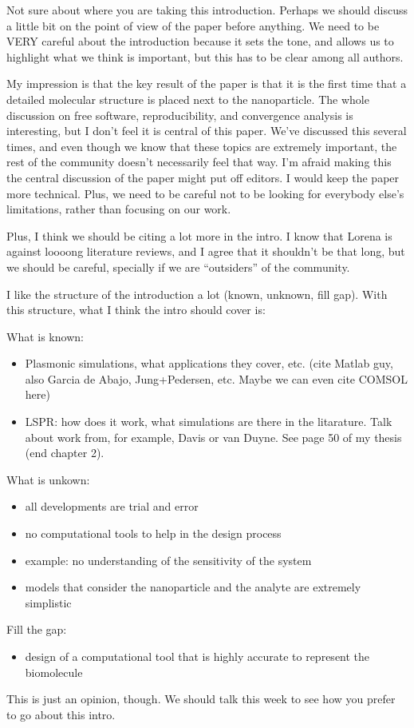 {\color{red} Not sure about where you are taking this introduction.
Perhaps we should discuss a little bit on the point of view of the paper before anything.
We need to be VERY careful about the introduction because it sets the tone, and allows us to highlight what we think is important, but this has to be clear among all authors. 

My impression is that the key result of the paper is that it is the first time that a detailed molecular structure is placed next to the nanoparticle.
The whole discussion on free software, reproducibility, and convergence analysis is interesting, but I don't feel it is central of this paper. 
We've discussed this several times, and even though we know that these topics are extremely important, the rest of the community doesn't necessarily feel that way.
I'm afraid making this the central discussion of the paper might put off editors. 
I would keep the paper more technical.
Plus, we need to be careful not to be looking for everybody else's limitations, rather than focusing on our work.

Plus, I think we should be citing a lot more in the intro. 
I know that Lorena is against loooong literature reviews, and I agree that it shouldn't be that long, but we should be careful, specially if we are ``outsiders'' of the community.

I like the structure of the introduction a lot (known, unknown, fill gap). 
With this structure, what I think the intro should cover is:

What is known:
\begin{itemize}
\item Plasmonic simulations, what applications they cover, etc. (cite Matlab guy, also Garcia de Abajo, Jung+Pedersen, etc. Maybe we can even cite COMSOL here)
\item LSPR: how does it work, what simulations are there in the litarature. Talk about work from, for example, Davis or van Duyne. See page 50 of my thesis (end chapter 2).
\end{itemize}

What is unkown:
\begin{itemize}
\item all developments are trial and error
\item no computational tools to help in the design process
\item example: no understanding of the sensitivity of the system
\item models that consider the nanoparticle and the analyte are extremely simplistic
\end{itemize}

Fill the gap:
\begin{itemize}
\item design of a computational tool that is highly accurate to represent the biomolecule
\end{itemize}

This is just an opinion, though.
We should talk this week to see how you prefer to go about this intro.

}

